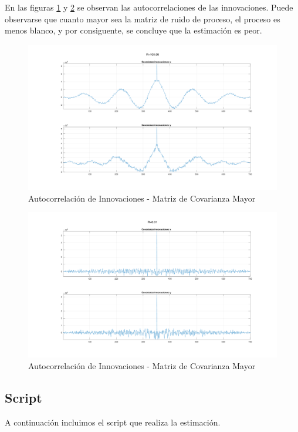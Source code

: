 	En las figuras \ref{fig:ej5r1_innov} y \ref{fig:ej5r2_innov} se observan las autocorrelaciones de las innovaciones. Puede observarse que cuanto mayor sea la matriz de ruido de proceso, el proceso es menos blanco, y por consiguente, se concluye que la estimación es peor.
	
	\begin{figure}[H]
		\centering
		\includegraphics[width=1.0\textwidth,keepaspectratio]{Figuras/covinn_ej6_R1.pdf}
		\caption{Autocorrelación de Innovaciones - Matriz de Covarianza Mayor}
		\label{fig:ej5r1_innov}
	\end{figure}
	
	\begin{figure}[H]
		\centering
		\includegraphics[width=1.0\textwidth,keepaspectratio]{Figuras/covinn_ej6_R2.pdf}
		\caption{Autocorrelación de Innovaciones - Matriz de Covarianza Mayor}
		\label{fig:ej5r2_innov}
	\end{figure}
	

\subsection{Script}

	A continuación incluimos el script que realiza la estimación.
	

